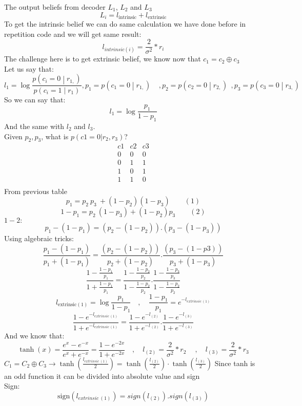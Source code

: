 The output beliefs from decoder $L_1$, $L_2$ and $L_3$ 
\[L_{i}=l_\text{intrinsic}+l_\text{extrinsic}\]
To get the intrinsic belief we can do same calculation we have done before in repetition code and we will get same result:
\[l_{intrinsic(i)}=\frac{2}{\sigma^2}\ast r_i\]
The challenge here is to get extrinsic belief, we know now that $c_1 = c_2 \oplus c_3$\\
Let us say that: 
\[l_1=\log\frac{p\left(c_i=0\middle| r_{1,}\right)}{p\left(c_i=1\middle| r_1\right)}   	, p_1=p\left(c_1=0\middle| r_{1,}\right)\ \ \ \ \ ,p_2=p\left(c_2=0\middle| r_{2,}\right)\ \ ,p_3=p\left(c_3=0\middle| r_{3,}\right)\]
So we can say that:
\[l_1=\log\frac{p_1}{1-p_1}\]
And the same with $l_2$ and $l_3$.\\
Given $p_2, p_3$, what is $p(c1=0|r_2, r_3)$?
\[\begin{matrix}c1&c2&c3\\0&0&0\\0&1&1\\1&0&1\\1&1&0\\\end{matrix}\]
From previous table 
\[p_1=p_2\ p_3\ +\left(1-p_2\right)\left(1-p_3\right) \qquad (1)\]
\[1-p_1=p_2\ \left(1-p_3\right)+\left(1-p_2\right)p_3 \qquad (2)\]
$1-2:$
\[p_1-\left(1-p_1\right)=\left(p_2-\left(1-p_2\right)\right).(p_3-\left(1-p_3\right))\]
Using algebraic tricks:
\[\frac{p_1-\left(1-p_1\right)}{p_1+\left(1-p_1\right)}=\frac{\left(p_2-\left(1-p_2\right)\right)}{p_2+\left(1-p_2\right)}.\frac{(p_3-\left(1-p3\right))}{p_3+\left(1-p_3\right)}\]
\[\frac{1-\frac{1-p_1}{p_1}}{1+\frac{1-p_1}{p_1}}=\frac{1-\frac{1-p_2}{p_2}}{1-\frac{1-p_2}{p_2}}.\frac{1-\frac{1-p_3}{p_3}}{1-\frac{1-p_2}{p_2}}\]
\[l_{\text{extrinsic}(1)}=\log\frac{p_1}{1-p_1} \quad , \quad \frac{1-p_1}{p_1}=e^{-l_{extrinsic\ (1)}}\]
\[\frac{1-e^{-l_{extrinsic\ (1)}}}{1+e^{-l_{extrinsic\ (1)}}}=\frac{1-e^{-l_{(2)}}}{1+e^{-l_{\ (2)}}}.\frac{1-e^{-l_{(3)}}}{1+e^{-l_{\ (3)}}}\]
And we know that: 
\[\tanh{\left(x\right)}=\frac{e^x-e^{-x}}{e^x+e^{-x}}=\frac{1-e^{-2x}}{1+e^{-2x}} \quad,\quad l_{(2)}=\frac{2}{\sigma^2}\ast r_2\ \quad,\quad l_{(3)}=\frac{2}{\sigma^2}\ast r_3\]
$C_1=C_2 \oplus C_3 \rightarrow \tanh{\left(\frac{l_{extrinsic\ (1)}}{2}\right)=\tanh{\left(\frac{l_{(2)}}{2}\right) \cdot \tanh{\left(\frac{l_{(3)}}{2}\right)}}}$
Since tanh is an odd function it can be divided into absolute value and sign \\
Sign:			
\[\text{sign}\left(l_{extrinsic\ \left(1\right)}\right)=sign\left(l_{\left(2\right)}\right).sign(l_{\left(3\right)})\]
